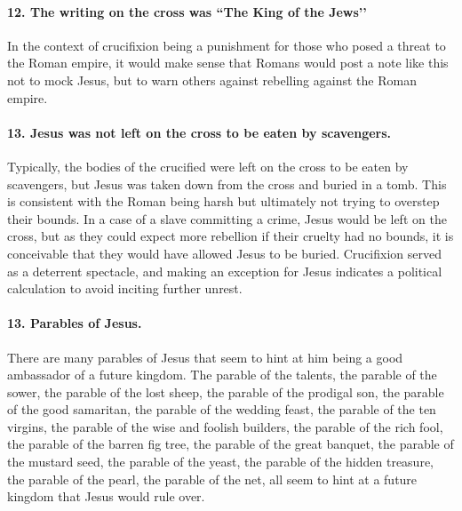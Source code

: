 \paragraph{12.
The writing on the cross was ``The King of the Jews’’}\label{par:the-writing-on-the-cross-was-the-king-of-the-jews}
In the context of crucifixion being a punishment for those who posed a threat to the Roman empire, it would make sense that Romans would post a note like this not to mock Jesus, but to warn others against rebelling against the Roman empire.
\paragraph{13.
Jesus was not left on the cross to be eaten by scavengers.}\label{par:jesus-was-not-left-on-the-cross-to-be-eaten-by-scavengers.}
Typically, the bodies of the crucified were left on the cross to be eaten by scavengers, but Jesus was taken down from the cross and buried in a tomb.
This is consistent with the Roman being harsh but ultimately not trying to overstep their bounds.
In a case of a slave committing a crime, Jesus would be left on the cross, but as they could expect more rebellion if their cruelty had no bounds, it is conceivable that they would have allowed Jesus to be buried.
Crucifixion served as a deterrent spectacle, and making an exception for Jesus indicates a political calculation to avoid inciting further unrest.
\paragraph{13.
Parables of Jesus.}\label{par:parables-of-jesus.}
There are many parables of Jesus that seem to hint at him being a good ambassador of a future kingdom.
The parable of the talents, the parable of the sower, the parable of the lost sheep, the parable of the prodigal son, the parable of the good samaritan, the parable of the wedding feast, the parable of the ten virgins, the parable of the wise and foolish builders, the parable of the rich fool, the parable of the barren fig tree, the parable of the great banquet, the parable of the mustard seed, the parable of the yeast, the parable of the hidden treasure, the parable of the pearl, the parable of the net, all seem to hint at a future kingdom that Jesus would rule over.
